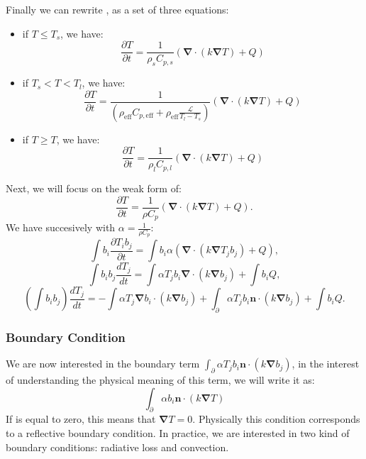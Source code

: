 \documentclass[letterpaper]{article}
\newcommand\bn{\boldsymbol{\nabla}}
\renewcommand{\(}{\left(}
\renewcommand{\)}{\right)}
\renewcommand{\[}{\left[}
\renewcommand{\]}{\right]}
\begin{document}
Finally we can rewrite , as a set of three equations:
\begin{itemize}
  \item if $T \leq T_s$, we have:
    \begin{equation}
      \frac{\partial T}{\partial t} = \frac{1}{\rho_s C_{p,s}} \(\bn \cdot \(k
      \bn T\) + Q\)
    \end{equation}
  \item if $T_s < T < T_l$, we have:
    \begin{equation}
      \frac{\partial T}{\partial t} = \frac{1}{\(\rho_{\text{eff}}
      C_{p,\text{eff}} + \rho_{\text{eff}} \frac{\mathcal{L}}{T_l-T_s}\)} \(
      \bn \cdot \(k \bn T\) + Q \)
    \end{equation}
  \item if $T \geq T$, we have:
    \begin{equation}
      \frac{\partial T}{\partial t} = \frac{1}{\rho_l C_{p,l}} \(\bn \cdot \(k
      \bn T\) + Q\)
    \end{equation}
\end{itemize}

Next, we will focus on the weak form of:
\begin{equation}
  \frac{\partial T}{\partial t} = \frac{1}{\rho C_{p}} \(\bn \cdot \(k
  \bn T\) + Q\).
\end{equation}
We have succesively with $\alpha = \frac{1}{\rho C_{p}}$:
\begin{equation}
 \int b_i \frac{\partial T_i b_j}{\partial t} = \int b_i \alpha \(\bn \cdot \(k
  \bn T_j b_j\) + Q\),
\end{equation}
\begin{equation}
  \int b_i b_j \frac{d T_j}{dt} = \int \alpha T_j b_i \bn \cdot \(k \bn b_j\) +
  \int b_i Q,
\end{equation}
\begin{equation}
  \(\int b_i b_j\) \frac{d T_j}{dt} = - \int \alpha T_j \bn b_i \cdot \(k \bn b_j\) +
  \int_{\partial} \alpha T_j b_i \boldsymbol{n}\cdot \(k \bn b_j\) + \int b_i Q.
\end{equation}

\subsubsection{Boundary Condition}
We are now interested in the boundary term  $\int_{\partial} \alpha T_j b_i
\boldsymbol{n}\cdot \(k \bn b_j\)$, in the interest of understanding the
physical meaning of this term, we will write it as:
\begin{equation}
 \int_{\partial} \alpha b_i \boldsymbol{n}\cdot \(k \bn T\)
  \label{boundary}
\end{equation}
If  is equal to zero, this means that $\bn T=0$. Physically this
condition corresponds to a reflective boundary condition. In practice, we are
interested in two kind of boundary conditions: radiative loss and convection.
\end{document}
